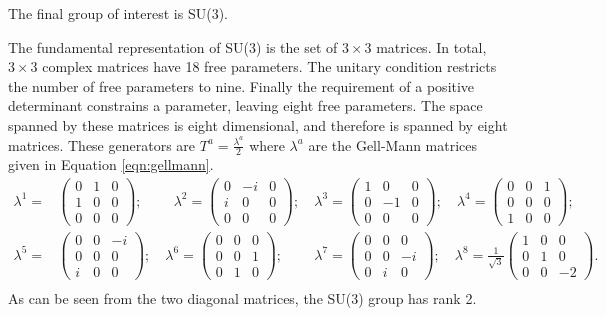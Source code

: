 The final group of interest is SU(3).

The fundamental representation of SU(3) is the set of $3\times3$ matrices.
In total, $3\times3$ complex matrices have 18 free parameters.
The unitary condition restricts the number of free parameters to nine.
Finally the requirement of a positive determinant constrains a parameter, leaving eight free parameters.
The space spanned by these matrices is eight dimensional, and therefore is spanned by eight matrices.
These generators are $T^a=\frac{\lambda^a}{2}$ where $\lambda^a$ are the Gell-Mann matrices given in Equation \ref{eqn:gellmann}.
\begin{equation}\begin{split}\label{eqn:gellmann}
    \lambda^1=&\begin{pmatrix}0&1&0\\ 1&0&0\\ 0&0&0\end{pmatrix};\phantom{-}\quad \lambda^2=\begin{pmatrix}0&-i&0\\ i&0&0\\ 0&0&0\end{pmatrix};\quad \lambda^3=\begin{pmatrix}1&0&0\\ 0&-1&0\\ 0&0&0\end{pmatrix};\quad \lambda^4=\begin{pmatrix}0&0&1\\ 0&0&0\\ 1&0&0\end{pmatrix};\quad \\
    \lambda^5=&\begin{pmatrix}0&0&-i\\ 0&0&0\\ i&0&0\end{pmatrix};\quad \lambda^6=\begin{pmatrix}0&0&0\\ 0&0&1\\ 0&1&0\end{pmatrix};\phantom{-}\quad \lambda^7=\begin{pmatrix}0&0&0\\ 0&0&-i\\ 0&i&0\end{pmatrix};\quad \lambda^8=\frac{1}{\sqrt{3}}\begin{pmatrix}1&0&0\\ 0&1&0\\ 0&0&-2\end{pmatrix}. \\
\end{split}\end{equation}
As can be seen from the two diagonal matrices, the SU(3) group has rank 2.

